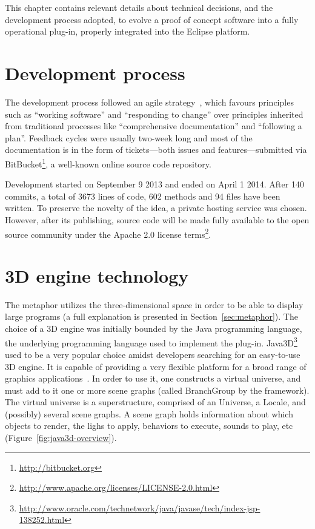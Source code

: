 This chapter contains relevant details about technical decisions, and the
development process adopted, to evolve a proof of concept software into
 a fully operational plug-in, properly integrated into the Eclipse platform.

\section{Development process}
The development process followed an agile strategy~\cite{beck2001agile},
which favours principles such as ``working software'' and ``responding to
change'' over principles inherited from traditional processes like ``comprehensive
documentation'' and ``following a plan''. Feedback cycles were usually
two-week long and most of the documentation is in the form of tickets---both
issues and features---submitted via
BitBucket\footnote{\url{http://bitbucket.org}}, a well-known online source code
repository.

Development started on September 9 2013 and ended on April
1 2014. After 140 commits, a total of
3673 lines of code, 602 methods and 94 files have been written.
To preserve the novelty of the idea, a private hosting service was chosen.
However, after its publishing, source code will be made fully available to
the open source community under the Apache 2.0 license
terms\footnote{\url{http://www.apache.org/licenses/LICENSE-2.0.html}}.

\section{3D engine technology}
The metaphor utilizes the three-dimensional space in order to be able to
display large programs (a full explanation is presented in
Section~\ref{sec:metaphor}). The choice of a 3D engine was initially bounded by
the Java programming language, the underlying programming language used to
implement the plug-in.
Java3D\footnote{\url{http://www.oracle.com/technetwork/java/javase/tech/index-jsp-138252.html}}
used to be a very popular choice amidst developers searching for an easy-to-use 3D
engine. It is capable of providing a very flexible platform for a broad range of
graphics applications~\cite{sowizral1999java}. In order to use it, one
constructs a virtual universe, and must add to it one or more scene graphs
(called BranchGroup by the framework). The virtual universe is a superstructure,
comprised of an Universe, a Locale, and (possibly) several scene graphs. A scene
graph holds information about which objects to render, the lighs to apply,
behaviors to execute, sounds to play, etc~\cite{sowizral1997java} (Figure~\ref{fig:java3d-overview}).

